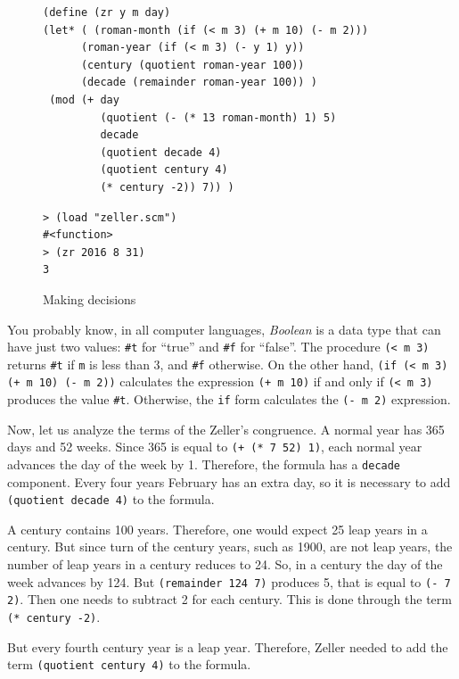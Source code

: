 \documentclass[a4paper,12pt]{book}
\newenvironment{fmpage}[1]
           {\begin{lrbox}{\fmbox}\begin{minipage}{#1}}
           {\end{minipage}\end{lrbox}\fbox{\usebox{\fmbox}}}
\begin{document}
\begin{figure}[!b]
\begin{fmpage}{0.9\linewidth}
\begin{verbatim}
(define (zr y m day)
(let* ( (roman-month (if (< m 3) (+ m 10) (- m 2)))
      (roman-year (if (< m 3) (- y 1) y))
      (century (quotient roman-year 100))
      (decade (remainder roman-year 100)) )
 (mod (+ day
         (quotient (- (* 13 roman-month) 1) 5)
         decade
         (quotient decade 4)
         (quotient century 4)
         (* century -2)) 7)) )
\end{verbatim}
\end{fmpage}

\begin{fmpage}{0.9\linewidth}
\begin{verbatim}
> (load "zeller.scm")
#<function>
> (zr 2016 8 31)
3
\end{verbatim}
\end{fmpage}
\caption{Making decisions}
\label{fig:zeller}
\end{figure}

You probably know, in all computer
languages, {\em Boolean} is a data type
that can have just two values: \verb|#t|
for ``true'' and \verb|#f| for ``false''.
The procedure \verb|(< m 3)| returns
\verb|#t| if \verb|m| is less than 3,
and \verb|#f| otherwise. On the other
hand, \verb|(if (< m 3) (+ m 10) (- m 2))|
calculates the expression \verb|(+ m 10)|
if and only if \verb|(< m 3)| produces
the value \verb|#t|. Otherwise, the
\verb|if| form calculates the \verb|(- m 2)|
expression.

Now, let us analyze the terms of the Zeller's
congruence. A
normal year has 365 days and 52 weeks.
Since 365 is equal to \verb|(+ (* 7 52) 1)|,
each normal year advances the day of the
week by 1. Therefore, the formula has a
\verb|decade| component.
Every four years
February has an extra day,
so it is necessary to add
\verb|(quotient decade 4)|
to the formula.

A century contains 100 years.
Therefore, one would expect  25
leap years in a century. But since
turn of the century years, such as 1900, are
not leap years, the number of leap
years in a century reduces to 24.
So, in a century the day of the
week advances by 124. But
\verb|(remainder 124 7)| produces
5, that is equal to \verb|(- 7 2)|.
Then one needs to subtract 2 for
each century. This is done through
the term \verb|(* century -2)|.

But every fourth century year is
a leap year. Therefore, Zeller needed to 
add the term \verb|(quotient century 4)|
to the formula.
\end{document}
